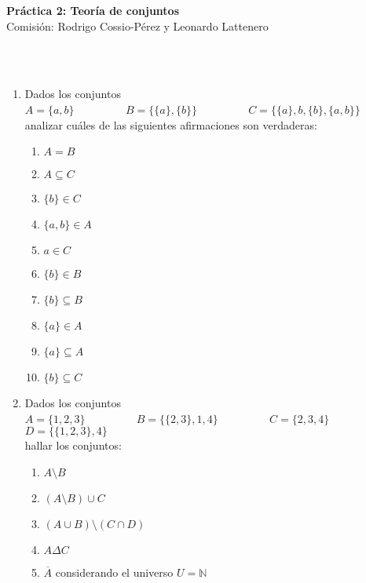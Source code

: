 \documentclass[a4paper]{article}
\newcommand{\exercise}{\item}
\newcommand{\intersec}{\cap}
\newcommand{\union}{\cup}
\newcommand{\symdiff}{\Delta}
\newcommand{\compl}[1]{\overline{#1}}
\begin{document}
\noindent \hrulefill 
\vspace{-7pt}
\begin{center} 
	\textbf{ Práctica 2: Teoría de conjuntos} \\
	Comisión: Rodrigo Cossio-Pérez y Leonardo Lattenero
\end{center}
\vspace{-10pt}
\hrulefill \\
\phantom{~} \\
\begin{enumerate}
	\exercise Dados los conjuntos \\ $A=\{a,b\}$ ~~~~~~~~ $B=\{ \{a\}, \{b\} \}$ ~~~~~~~~ $C=\{ \{a\}, b, \{b\}, \{a,b\} \}$ \\ analizar cuáles de las siguientes afirmaciones son verdaderas:
	\begin{multicols}{3}
	\begin{enumerate} [label=(\alph*)]
		\item $A=B$
		\item $A \subseteq C$
		\item $\{b\} \in C$
		\item $\{a,b\} \in A$
		\item $a \in C$
		\item $\{b\} \in B$
		\item $\{b\} \subseteq B$
		\item $\{a\} \in A$
		\item $\{a\} \subseteq A$
		\item $\{b\} \subseteq C$
	\end{enumerate}
	\end{multicols}
	\exercise Dados los conjuntos \\ $A=\{1,2,3\}$ ~~~~~~~~ $B=\{ \{2,3\}, 1, 4\}$ ~~~~~~~~ $C=\{ 2,3,4 \}$ ~~~~~~~~ $D=\{ \{1,2,3\} ,4 \}$ \\ hallar los conjuntos: 
	\begin{multicols}{3}
	\begin{enumerate} [label=(\alph*)]
		\item $A\setminus B$
		\item $(A \setminus B) \union C$
		\item $(A \union B) \setminus (C \intersec D)$
		\item $A \symdiff C$
		\item $\compl{A}$ considerando el universo $U=\mathbb{N}$
	\end{enumerate}
	\end{multicols}

\end{enumerate}
\end{document}
